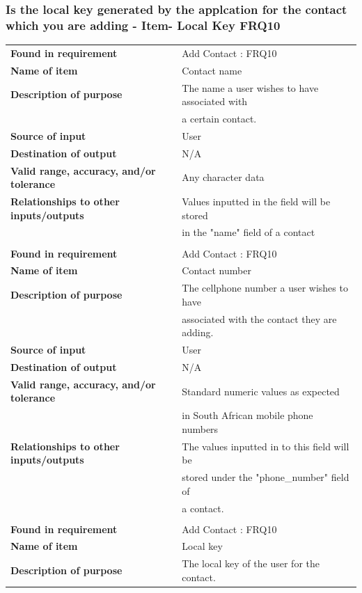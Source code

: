 \subsubsection{Is the local key generated by the applcation for the contact which you are adding - Item- Local Key FRQ10}
\begin{tabular}{ll}
\textbf{Found in requirement}&Add Contact : FRQ10\\
\textbf{Name of item}&Contact name\\
\textbf{Description of purpose}&The name a user wishes to have associated with\\& a certain contact.\\
\textbf{Source of input}&User\\
\textbf{Destination of output}&N/A\\
\textbf{Valid range, accuracy, and/or tolerance}&Any character data\\
\textbf{Relationships to other inputs/outputs}&Values inputted in the field will be stored\\& in the "name" field of a contact\\
&\\
\textbf{Found in requirement}&Add Contact : FRQ10\\
\textbf{Name of item}&Contact number\\
\textbf{Description of purpose}&The cellphone number a user wishes to have\\& associated with the contact they are adding.\\
\textbf{Source of input}&User\\
\textbf{Destination of output}&N/A\\
\textbf{Valid range, accuracy, and/or tolerance}&Standard numeric values as expected \\&in South African mobile phone numbers\\
\textbf{Relationships to other inputs/outputs}&The values inputted in to this field will be \\&stored under the "phone\_number" field of \\&a contact.\\
&\\
\textbf{Found in requirement}&Add Contact : FRQ10\\
\textbf{Name of item}&Local key\\
\textbf{Description of purpose}&The local key of the user for the contact.\\

\end{tabular}

